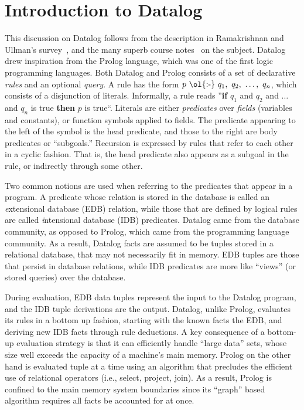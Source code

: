 \section{Introduction to Datalog}
\label{ch:p2:sec:datalog}

This discussion on Datalog follows from the description in Ramakrishnan and
Ullman's survey~\cite{deductive-database}, and the many superb course
notes~\cite{ullmanNotes} on the subject.  Datalog drew inspiration from the
Prolog language, which was one of the first logic programming languages.  Both
Datalog and Prolog consists of a set of declarative {\em rules} and an optional
{\em query}.  A rule has the form $p\ \text{\ol{:-}}\ q_1,\ q_2,\ \ldots,\
q_n$, which consists of a disjunction of literals.  Informally, a rule reads
''{\bf if} $q_1$ and $q_2$ and $\ldots$ and $q_n$ is true {\bf then} $p$ is
true``.  Literals are either {\em predicates} over {\em fields} (variables and
constants), or function symbols applied to fields.  The predicate appearing to
the left of the \ol{:-} symbol is the head predicate, and those to the right
are body predicates or ``subgoals.'' Recursion is expressed by rules that refer
to each other in a cyclic fashion.  That is, the head predicate also appears as
a subgoal in the rule, or indirectly through some other.

Two common notions are used when referring to the predicates that appear in a
program.  A predicate whose relation is stored in the database is called an
{\emph extensional database} (EDB) relation, while those that are defined by
logical rules are called {\emph intensional database} (IDB) predicates.
Datalog came from the database community, as opposed to Prolog, which came from
the programming language community.  As a result, Datalog facts are assumed to
be tuples stored in a relational database, that may not necessarily fit in
memory.  EDB tuples are those that persist in database relations, while IDB
predicates are more like ``views'' (or stored queries) over the database.

During evaluation, EDB data tuples represent the input to the Datalog program,
and the IDB tuple derivations are the output.  Datalog, unlike Prolog,
evaluates its rules in a bottom up fashion, starting with the known facts the
EDB, and deriving new IDB facts through rule deductions.  A key consequence of
a bottom-up evaluation strategy is that it can efficiently handle ``large
data'' sets, whose size well exceeds the capacity of a machine's main memory.
Prolog on the other hand is evaluated tuple at a time using an algorithm that
precludes the efficient use of relational operators (i.e., select, project,
join).  As a result, Prolog is confined to the main memory system boundaries
since its ``graph'' based algorithm requires all facts be accounted for at
once.

